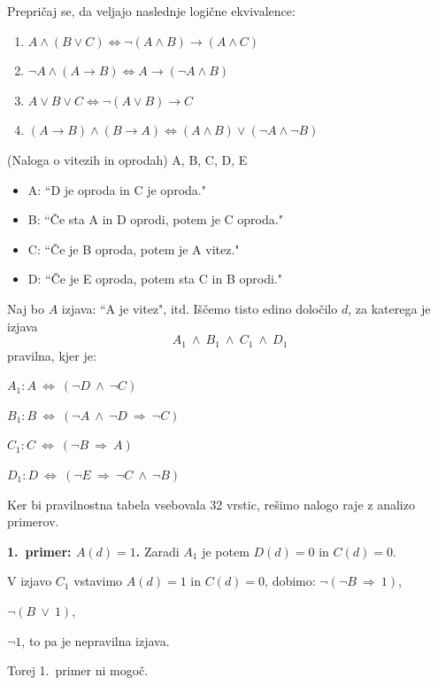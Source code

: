 \documentclass[11pt,paper=b5,footinclude,headinclude]{scrbook} %
\def\ali {{~\vee~}}
\def\inn {{~\wedge~}}
\def\sledi {{~\Rightarrow~}}
\def\cee {{~\Leftrightarrow~}}
\newtheorem{ex}{Vaja\hypertarget{sol:\theex}}[chapter]
\begin{document}
\begin{ex}
\end{ex} \begin{ex} Prepričaj se, da veljajo naslednje logične ekvivalence:
\begin{enumerate}
  \item $A \land (B \lor C) \iff \neg (A \land B) \rightarrow (A \land C)$
  \item $\neg A \land (A \rightarrow B) \iff A \rightarrow (\neg A \land B)$
  \item $A \lor B \lor C \iff \neg (A \lor B) \rightarrow C$
  \item $(A \rightarrow B) \land (B \rightarrow A) \iff (A \land B) \lor (\neg A \land \neg B)$
\end{enumerate}

    \end{ex} \begin{ex} 
    (Naloga o vitezih in oprodah)
A, B, C, D, E
\begin{itemize}
  \item A: ``D je oproda in C je oproda."
  \item B: ``Če sta A in D oprodi, potem je C oproda."
  \item C: ``Če je B oproda, potem je A vitez."
  \item D: ``Če je E oproda, potem sta C in B oprodi."
\end{itemize}

\begin{sol}
Naj bo $A$ izjava: ``A je vitez", itd.
Iščemo tisto edino določilo $d$, za katerega je izjava $$A_1\inn B_1\inn C_1\inn D_1$$
pravilna, kjer je:

$A_1: A\cee (\neg D \inn \neg C)$

$B_1: B\cee (\neg A \inn \neg D\sledi \neg C)$

$C_1: C\cee (\neg B \sledi A)$

$D_1: D\cee (\neg E \sledi \neg C \inn \neg B)$


Ker bi pravilnostna tabela vsebovala 32 vrstic, rešimo nalogo
raje z analizo primerov.

\textbf{1.~primer: $A(d) = 1$.}
Zaradi $A_1$ je potem $D(d) = 0$ in $C(d) = 0$.

V izjavo $C_1$ vstavimo $A(d) = 1$ in $C(d) = 0$, dobimo:
$\neg(\neg B\sledi 1)$,

$\neg(B\ali 1)$,

$\neg 1$, to pa je nepravilna izjava.

Torej 1.~primer ni mogoč.
%
%
%
%
%
%


\end{sol}
\end{ex}
\end{document}
